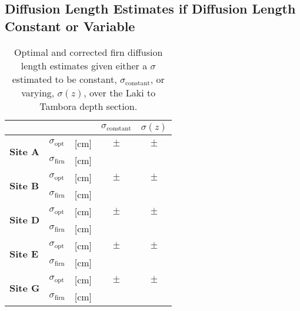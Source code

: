 \documentclass[../../CompleteThesis2/Complete_2ndDraft]{subfiles}
\begin{document}
\subsection[$\sigma$ Constant or Variable]{Diffusion Length Estimates if Diffusion Length Constant or Variable}
\label{Subsec:Results_DiffLenEst_AlphabetCores_SigConstVar}

\begin{table}[ht]
	\centering
	\begin{tabular}{l l l | c | c}
		& & & $\sigma_{\text{constant}}$ & $\sigma(z)$\\
		\hline
		\hline 
		\multirow{2}{*}{\textbf{Site A}} & $\sigma_{\text{opt}}$ & [cm] & $ \pm$ & $ \pm $\\
		& $\sigma_{\text{firn}}$ & [cm] & & \\
		\hline
		
		\multirow{2}{*}{\textbf{Site B}} & $\sigma_{\text{opt}}$ & [cm] & $ \pm $ & $ \pm $ \\
		& $\sigma_{\text{firn}}$ & [cm] & & \\
		\hline
		
		\multirow{2}{*}{\textbf{Site D}} & $\sigma_{\text{opt}}$ & [cm] & $ \pm $ & $ \pm $ \\
		& $\sigma_{\text{firn}}$ & [cm] & & \\
		\hline
		
		\multirow{2}{*}{\textbf{Site E}} & $\sigma_{\text{opt}}$ & [cm] & $ \pm $ & $ \pm $ \\
		& $\sigma_{\text{firn}}$ & [cm] & & \\
		\hline
		
		\multirow{2}{*}{\textbf{Site G}} & $\sigma_{\text{opt}}$ & [cm] & $ \pm $ & $ \pm $ \\
		& $\sigma_{\text{firn}}$ & [cm] & & \\
		
		\hline
	\end{tabular}
	\caption[$\sigma$ Given Constant or Varying]{\small Optimal and corrected firn diffusion length estimates given either a $\sigma$ estimated to be constant, $\sigma_{\text{constant}}$, or varying, $\sigma(z)$, over the Laki to Tambora depth section. }
\end{table}
\end{document}

